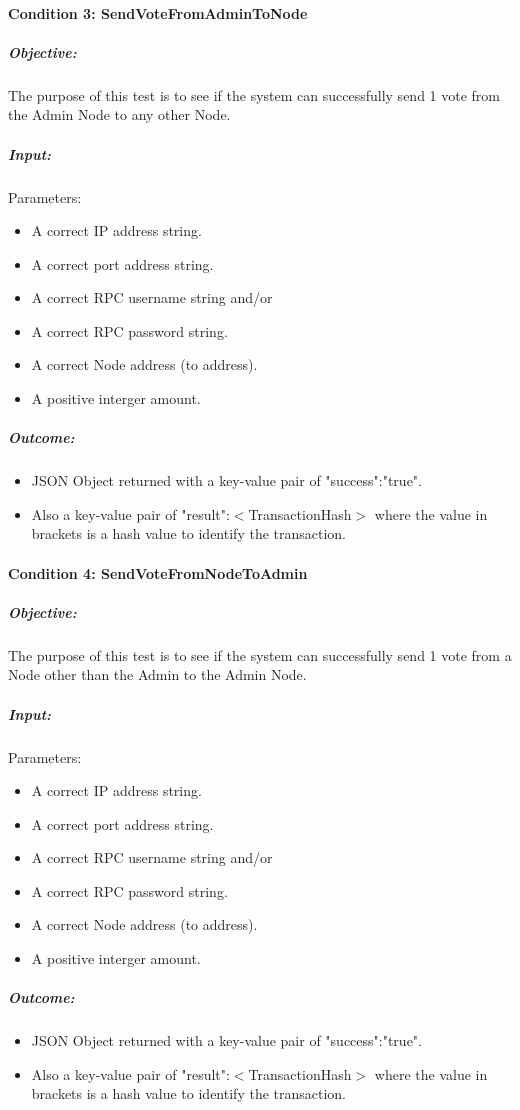 \documentclass[11pt]{article}
\begin{document}
	\paragraph{Condition 3: SendVoteFromAdminToNode}	
	\subparagraph{Objective:}
	The purpose of this test is to see if the system can successfully send 1 vote from the Admin Node to any other Node.
	\subparagraph{Input:}
	Parameters:
	\begin{itemize}
		\item A correct IP address string.
		\item A correct port address string.
		\item A correct RPC username string and/or
		\item A correct RPC password string.
		\item A correct Node address (to address).
		\item A positive interger amount.
	\end{itemize}
	\subparagraph{Outcome:}
	\begin{itemize}
		\item JSON Object returned with a key-value pair of "success":"true".
		\item Also a key-value pair of "result":$<$TransactionHash$>$ where the value in brackets is a hash value to identify the transaction.
	\end{itemize}
	
	\paragraph{Condition 4: SendVoteFromNodeToAdmin}	
	\subparagraph{Objective:}
	The purpose of this test is to see if the system can successfully send 1 vote from a Node other than the Admin to the Admin Node.
	\subparagraph{Input:}
	Parameters:
	\begin{itemize}
		\item A correct IP address string.
		\item A correct port address string.
		\item A correct RPC username string and/or
		\item A correct RPC password string.
		\item A correct Node address (to address).
		\item A positive interger amount.
	\end{itemize}
	\subparagraph{Outcome:}
	\begin{itemize}
		\item JSON Object returned with a key-value pair of "success":"true".
		\item Also a key-value pair of "result":$<$TransactionHash$>$ where the value in brackets is a hash value to identify the transaction.
	\end{itemize}
	
\end{document}
